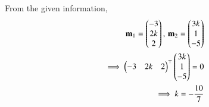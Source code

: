 From the given information,
\begin{align}
\mathbf{m}_1 = \begin{pmatrix}-3\\ 2k\\ 2\end{pmatrix},\,  \mathbf{m}_2 =\begin{pmatrix}3k\\ 1\\ -5\end{pmatrix} 
\\
	\implies \begin{pmatrix}-3& 2k& 2\end{pmatrix}^{\top} \begin{pmatrix}3k\\ 1\\ -5\end{pmatrix} =0
	\\
	\implies k = -\frac{10}{7}
\end{align}

